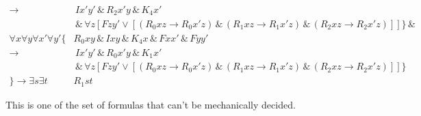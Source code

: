 \documentclass{article}
\begin{document}
\begin{align*}
    \rightarrow &\, Ix'y' \,\&\,  R_2x'y \,\&\, K_4x' \\
    & \,\&\, \forall z \left[ Fzy' \vee
      \left[
        \left( R_0xz \rightarrow R_0x'z \right) \,\&\, 
        \left( R_1xz \rightarrow R_1x'z \right) \,\&\, 
        \left( R_2xz \rightarrow R_2x'z \right)
      \right]
    \right]
  \} \,\&\, \\
  \forall x \forall y \forall x' \forall y' \{
    & R_0xy \,\&\, Ixy  \,\&\, K_4 x  \,\&\,  Fxx'  \,\&\,  Fyy' \\
    \rightarrow &\, Ix'y' \,\&\,  R_0x'y \,\&\, K_1x' \\
    & \,\&\, \forall z \left[ Fzy' \vee
      \left[
        \left( R_0xz \rightarrow R_0x'z \right) \,\&\, 
        \left( R_1xz \rightarrow R_1x'z \right) \,\&\, 
        \left( R_2xz \rightarrow R_2x'z \right)
      \right]
    \right]
  \} \\
  \} \rightarrow \exists s \exists t & R_1st
\end{align*}

This is one of the set of formulas that can't be mechanically decided.
\end{document}
